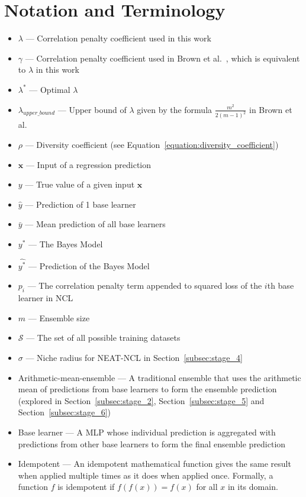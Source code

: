 \newpage
\section*{Notation and Terminology}
\begin{itemize}
    \item $\lambda$ — Correlation penalty coefficient used in this work
    \item $\gamma$ — Correlation penalty coefficient used in Brown et al.\ \cite{brown2005managing}, which is equivalent to $\lambda$ in this work
    \item $\lambda^*$ — Optimal $\lambda$
    \item $\lambda_{upper\_bound}$ — Upper bound of $\lambda$ given by the formula $\frac{m^2}{2(m - 1)^2}$ in Brown et al.\ \cite{brown2005managing}
    \item $\rho$ — Diversity coefficient (see Equation~\ref{equation:diversity_coefficient})
    \item $\mathbf{x}$ — Input of a regression prediction
    \item $y$ — True value of a given input $\mathbf{x}$
    \item $\hat{y}$ — Prediction of 1 base learner
    \item $\bar{y}$ — Mean prediction of all base learners
    \item $y^*$ — The Bayes Model
    \item $\hat{y^*}$ — Prediction of the Bayes Model
    \item $p_i$ — The correlation penalty term appended to squared loss of the $i$th base learner in NCL
    \item $m$ — Ensemble size
    \item $\mathcal{S}$ — The set of all possible training datasets
    \item $\sigma$ — Niche radius for NEAT-NCL in Section~\ref{subsec:stage_4}
    \item Arithmetic-mean-ensemble — A traditional ensemble that uses the arithmetic mean of predictions from base learners to form the ensemble prediction (explored in Section~\ref{subsec:stage_2}, Section~\ref{subsec:stage_5} and Section~\ref{subsec:stage_6})
    \item Base learner — A MLP whose individual prediction is aggregated with predictions from other base learners to form the final ensemble prediction
    \item Idempotent — An idempotent mathematical function gives the same result when applied multiple times as it does when applied once. Formally, a function $f$ is idempotent if $f(f(x)) = f(x)$ for all $x$ in its domain. 

\end{itemize}
